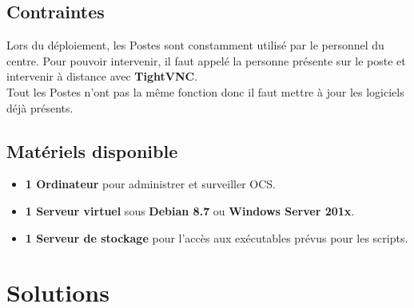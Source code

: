 \documentclass[11pt,a4paper,oneside]{article}
\begin{document}
\subsection{Contraintes}
Lors du déploiement, les Postes sont constamment utilisé par le personnel du centre. Pour pouvoir intervenir, il faut appelé la personne présente sur le poste et intervenir à distance avec \textbf{TightVNC}.\\

Tout les Postes n'ont pas la même fonction donc il faut mettre à jour les logiciels déjà présents.

\subsection{Matériels disponible}
\begin{itemize}
	\item \textbf{1 Ordinateur} pour administrer et surveiller OCS.
	\item \textbf{1 Serveur virtuel} sous \textbf{Debian 8.7} ou \textbf{Windows Server 201x}.
	\item \textbf{1 Serveur de stockage} pour l'accès aux exécutables prévus pour les scripts. 
\end{itemize}
\newpage

\section{Solutions}
\end{document}
